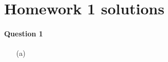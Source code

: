 \documentclass[11pt,a4paper]{article}
\author{Zehao Gao}
\begin{document}
\section{Homework 1 solutions}

\paragraph{Question 1}

\begin{enumerate}
\item[(a)]

\end{enumerate}
\end{document}
